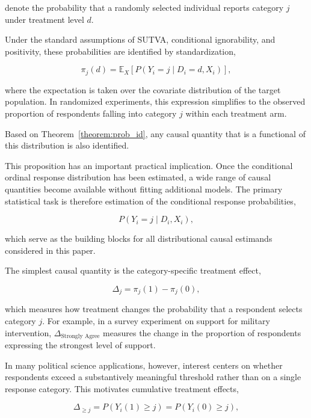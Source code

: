 \documentclass{article}
\begin{document}
denote the probability that a randomly selected individual reports category $j$ under treatment level $d$.

\begin{theorem}
  \label{theorem:prob_id}
Under the standard assumptions of SUTVA, conditional ignorability, and positivity, these probabilities are identified by standardization,

\[
\pi_j(d) = \mathbb{E}_X\left[P\left( Y_i=j \mid D_i=d,X_i \right)\right],
\]

where the expectation is taken over the covariate distribution of the target population. In randomized experiments, this expression simplifies to the observed proportion of respondents falling into category $j$ within each treatment arm.
\end{theorem}

\begin{proposition}
  Based on Theorem~\ref{theorem:prob_id}, any causal quantity that is a functional of this distribution is also identified.
\end{proposition}

This proposition has an important practical implication. Once the conditional ordinal response distribution has been estimated, a wide range of causal quantities become available without fitting additional models. The primary statistical task is therefore estimation of the conditional response probabilities,

\[
P(Y_i=j\mid D_i,X_i),
\]

which serve as the building blocks for all distributional causal estimands considered in this paper.

The simplest causal quantity is the category-specific treatment effect,

\[
\Delta_j = \pi_j(1)-\pi_j(0),
\]

which measures how treatment changes the probability that a respondent selects category $j$. For example, in a survey experiment on support for military intervention, $\Delta_{\text{Strongly Agree}}$ measures the change in the proportion of respondents expressing the strongest level of support.

In many political science applications, however, interest centers on whether respondents exceed a substantively meaningful threshold rather than on a single response category. This motivates cumulative treatment effects,

\[
\Delta_{\ge j} = P\left( Y_i(1)\ge j \right) = P\left( Y_i(0)\ge j \right),
\]
\end{document}

